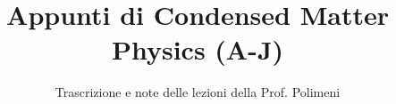\documentclass[a4paper,12pt]{article}
\title{Appunti di Condensed Matter Physics (A-J)}
\author{Trascrizione e note delle lezioni della Prof. Polimeni}
\date{}
\begin{document}
\maketitle
\projectintro
\tableofcontents
\newpage


% 
% 
% 

\end{document}

